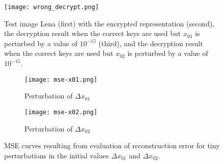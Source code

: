 \begin{figure}[htb]
	\texttt{[image: wrong\_decrypt.png]}
	\caption{Test image Lena (first) with the encrypted representation (second), the decryption result when the correct keys are used but $x_{01}$ is perturbed by a value of $10^{-15}$ (third), and the decryption result when the correct keys are used but $x_{02}$ is perturbed by a value of $10^{-15}$.}
	\label{fig:wrong-decryption}
\end{figure}

\begin{figure}[htb]
	\centering
	\begin{subfigure}{0.49\textwidth}
		\centering
		\texttt{[image: mse-x01.png]}
		\caption{Perturbation of $\Delta x_{01}$}
		\label{fig:perturb-mse-x01}
	\end{subfigure} 
	\begin{subfigure}{0.49\textwidth}
		\centering
		\texttt{[image: mse-x02.png]}
		\caption{Perturbation of $\Delta x_{02}$}
		\label{fig:perturb-mse-x02}
	\end{subfigure}
	\caption{MSE curves resulting from evaluation of reconstruction error for tiny perturbations in the initial values $\Delta x_{01}$ and $\Delta x_{02}$.}
	\label{fig:perturb-mse}
\end{figure}